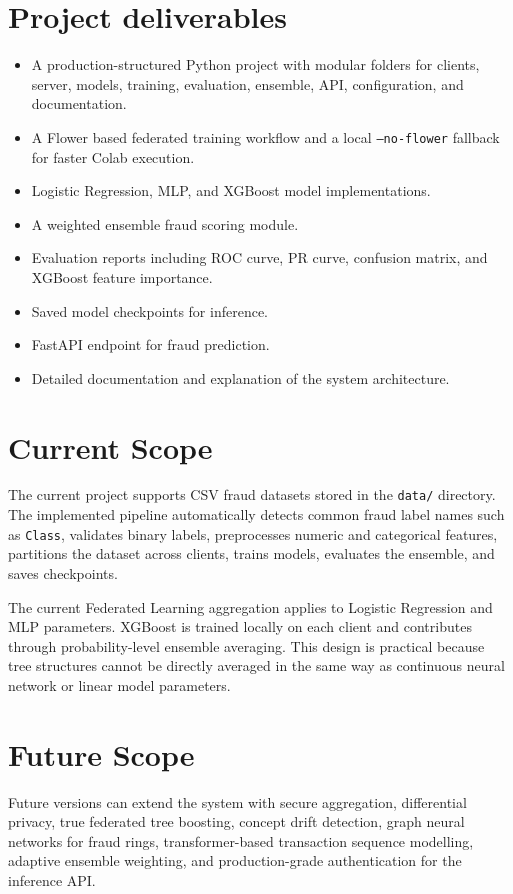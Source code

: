 \section{Project deliverables}
\begin{itemize}
    \item A production-structured Python project with modular folders for clients, server, models, training, evaluation, ensemble, API, configuration, and documentation.
    \item A Flower based federated training workflow and a local \texttt{--no-flower} fallback for faster Colab execution.
    \item Logistic Regression, MLP, and XGBoost model implementations.
    \item A weighted ensemble fraud scoring module.
    \item Evaluation reports including ROC curve, PR curve, confusion matrix, and XGBoost feature importance.
    \item Saved model checkpoints for inference.
    \item FastAPI endpoint for fraud prediction.
    \item Detailed documentation and explanation of the system architecture.
\end{itemize}

\section{Current Scope}
The current project supports CSV fraud datasets stored in the \texttt{data/} directory. The implemented pipeline automatically detects common fraud label names such as \texttt{Class}, validates binary labels, preprocesses numeric and categorical features, partitions the dataset across clients, trains models, evaluates the ensemble, and saves checkpoints.

The current Federated Learning aggregation applies to Logistic Regression and MLP parameters. XGBoost is trained locally on each client and contributes through probability-level ensemble averaging. This design is practical because tree structures cannot be directly averaged in the same way as continuous neural network or linear model parameters.


\section{Future Scope}
Future versions can extend the system with secure aggregation, differential privacy, true federated tree boosting, concept drift detection, graph neural networks for fraud rings, transformer-based transaction sequence modelling, adaptive ensemble weighting, and production-grade authentication for the inference API.
